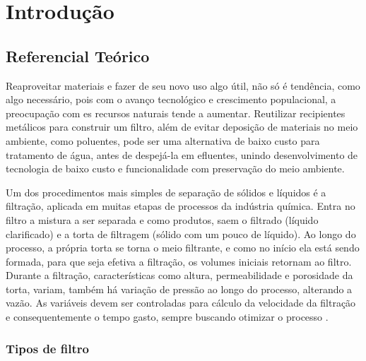 \chapter{Introdução} \label{sec:intro}

\section{Referencial Teórico}\label{sec:refteo}

Reaproveitar materiais e fazer de seu novo uso algo útil, não só é tendência,
como algo necessário, pois com o avanço tecnológico e crescimento populacional,
a preocupação com es recursos naturais tende a aumentar. Reutilizar recipientes
metálicos para construir um filtro, além de evitar deposição de materiais no
meio ambiente, como poluentes, pode ser uma alternativa de baixo custo para
tratamento de água, antes de despejá-la em efluentes, unindo desenvolvimento de
tecnologia de baixo custo e funcionalidade com preservação do meio ambiente.

Um dos procedimentos mais simples de separação de sólidos e líquidos é a
filtração, aplicada em muitas etapas de processos da indústria química. Entra no
filtro a mistura a ser separada e como produtos, saem o filtrado (líquido
clarificado) e a torta de filtragem (sólido com um pouco de líquido). Ao longo
do processo, a própria torta se torna o meio filtrante, e como no início ela
está sendo formada, para que seja efetiva a filtração, os volumes iniciais
retornam ao filtro. Durante a filtração, características como altura,
permeabilidade e porosidade da torta, variam, também há variação de pressão ao
longo do processo, alterando a vazão. As variáveis devem ser controladas para
cálculo da velocidade da filtração e consequentemente o tempo gasto, sempre
buscando otimizar o processo  .

\subsection{Tipos de filtro}

\label{subsec:tiposdefiltro}

